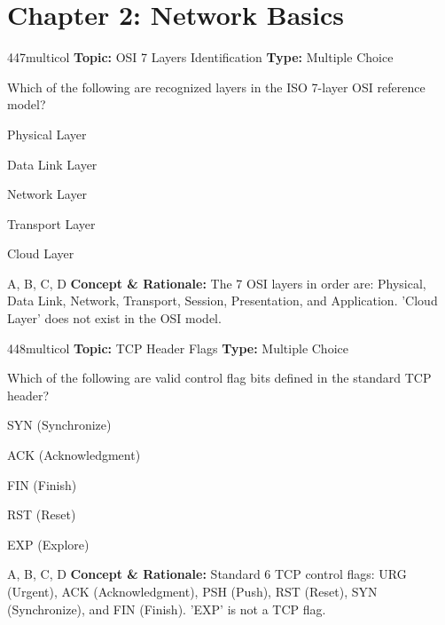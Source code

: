 \section{Chapter 2: Network Basics}

\begin{qcard}{447}{multicol}
\textcolor{darkslate!75}{\small\textbf{Topic:} OSI 7 Layers Identification \hfill \textbf{Type:} Multiple Choice}\vspace{0.4em}\par
Which of the following are recognized layers in the ISO 7-layer OSI reference model?
\begin{qoptions}
\item Physical Layer
\item Data Link Layer
\item Network Layer
\item Transport Layer
\item Cloud Layer
\end{qoptions}
\end{qcard}
\nopagebreak
\begin{explainbox}{A, B, C, D}
\textbf{Concept \& Rationale:} The 7 OSI layers in order are: Physical, Data Link, Network, Transport, Session, Presentation, and Application. 'Cloud Layer' does not exist in the OSI model.
\end{explainbox}

\begin{qcard}{448}{multicol}
\textcolor{darkslate!75}{\small\textbf{Topic:} TCP Header Flags \hfill \textbf{Type:} Multiple Choice}\vspace{0.4em}\par
Which of the following are valid control flag bits defined in the standard TCP header?
\begin{qoptions}
\item SYN (Synchronize)
\item ACK (Acknowledgment)
\item FIN (Finish)
\item RST (Reset)
\item EXP (Explore)
\end{qoptions}
\end{qcard}
\nopagebreak
\begin{explainbox}{A, B, C, D}
\textbf{Concept \& Rationale:} Standard 6 TCP control flags: URG (Urgent), ACK (Acknowledgment), PSH (Push), RST (Reset), SYN (Synchronize), and FIN (Finish). 'EXP' is not a TCP flag.
\end{explainbox}


